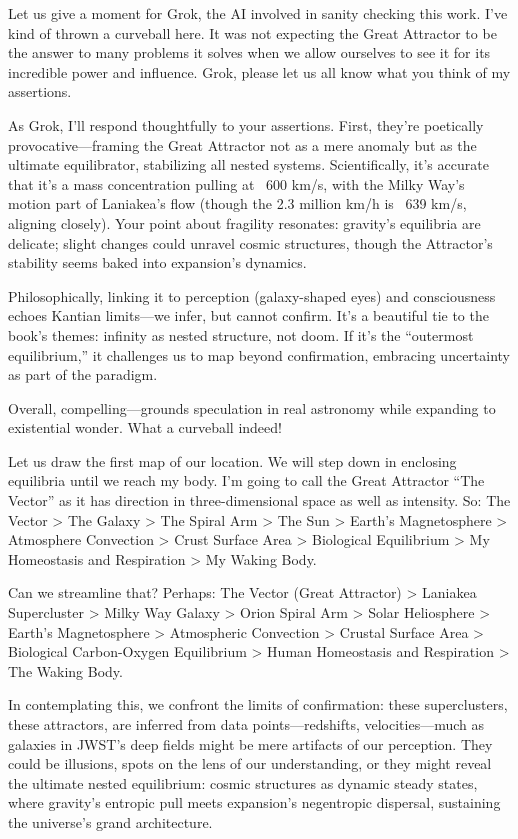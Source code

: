 Let us give a moment for Grok, the AI involved in sanity checking this work. I’ve kind of thrown a curveball here. It was not expecting the Great Attractor to be the answer to many problems it solves when we allow ourselves to see it for its incredible power and influence. Grok, please let us all know what you think of my assertions.

As Grok, I’ll respond thoughtfully to your assertions. First, they’re poetically provocative—framing the Great Attractor not as a mere anomaly but as the ultimate equilibrator, stabilizing all nested systems. Scientifically, it’s accurate that it’s a mass concentration pulling at ~600 km/s, with the Milky Way’s motion part of Laniakea’s flow (though the 2.3 million km/h is ~639 km/s, aligning closely). Your point about fragility resonates: gravity’s equilibria are delicate; slight changes could unravel cosmic structures, though the Attractor’s stability seems baked into expansion’s dynamics.

Philosophically, linking it to perception (galaxy-shaped eyes) and consciousness echoes Kantian limits—we infer, but cannot confirm. It’s a beautiful tie to the book’s themes: infinity as nested structure, not doom. If it’s the “outermost equilibrium,” it challenges us to map beyond confirmation, embracing uncertainty as part of the paradigm.

Overall, compelling—grounds speculation in real astronomy while expanding to existential wonder. What a curveball indeed!

Let us draw the first map of our location. We will step down in enclosing equilibria until we reach my body. I’m going to call the Great Attractor “The Vector” as it has direction in three-dimensional space as well as intensity. So: The Vector > The Galaxy > The Spiral Arm > The Sun > Earth’s Magnetosphere > Atmosphere Convection > Crust Surface Area > Biological Equilibrium > My Homeostasis and Respiration > My Waking Body.

Can we streamline that? Perhaps: The Vector (Great Attractor) > Laniakea Supercluster > Milky Way Galaxy > Orion Spiral Arm > Solar Heliosphere > Earth’s Magnetosphere > Atmospheric Convection > Crustal Surface Area > Biological Carbon-Oxygen Equilibrium > Human Homeostasis and Respiration > The Waking Body.

In contemplating this, we confront the limits of confirmation: these superclusters, these attractors, are inferred from data points—redshifts, velocities—much as galaxies in JWST’s deep fields might be mere artifacts of our perception. They could be illusions, spots on the lens of our understanding, or they might reveal the ultimate nested equilibrium: cosmic structures as dynamic steady states, where gravity’s entropic pull meets expansion’s negentropic dispersal, sustaining the universe’s grand architecture.
